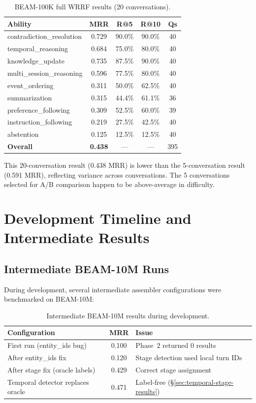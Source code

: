 \documentclass[11pt]{article}
\begin{document}
\begin{table}[h]
\centering
\caption{BEAM-100K full WRRF results (20 conversations).}
\label{tab:100k-full}
\begin{tabular}{lcccc}
\toprule
Ability & MRR & R@5 & R@10 & Qs \\
\midrule
contradiction\_resolution & 0.729 & 90.0\% & 90.0\% & 40 \\
temporal\_reasoning & 0.684 & 75.0\% & 80.0\% & 40 \\
knowledge\_update & 0.735 & 87.5\% & 90.0\% & 40 \\
multi\_session\_reasoning & 0.596 & 77.5\% & 80.0\% & 40 \\
event\_ordering & 0.311 & 50.0\% & 62.5\% & 40 \\
summarization & 0.315 & 44.4\% & 61.1\% & 36 \\
preference\_following & 0.309 & 52.5\% & 60.0\% & 39 \\
instruction\_following & 0.219 & 27.5\% & 42.5\% & 40 \\
abstention & 0.125 & 12.5\% & 12.5\% & 40 \\
\midrule
\textbf{Overall} & \textbf{0.438} & --- & --- & 395 \\
\bottomrule
\end{tabular}
\end{table}

This 20-conversation result (0.438 MRR) is lower than the
5-conversation result (0.591 MRR), reflecting variance across
conversations.  The 5 conversations selected for A/B comparison
happen to be above-average in difficulty.

\section{Development Timeline and Intermediate Results}
\label{app:dev-timeline}

\subsection{Intermediate BEAM-10M Runs}

During development, several intermediate assembler configurations
were benchmarked on BEAM-10M:

\begin{table}[h]
\centering
\caption{Intermediate BEAM-10M results during development.}
\label{tab:intermediate}
\begin{tabular}{lcp{5cm}}
\toprule
Configuration & MRR & Issue \\
\midrule
First run (entity\_ids bug) & 0.100 & Phase~2 returned 0 results \\
After entity\_ids fix & 0.120 & Stage detection used local turn IDs \\
After stage fix (oracle labels) & 0.429 & Correct stage assignment \\
Temporal detector replaces oracle & 0.471 & Label-free (\S\ref{sec:temporal-stage-results}) \\
\bottomrule
\end{tabular}
\end{table}
\end{document}
